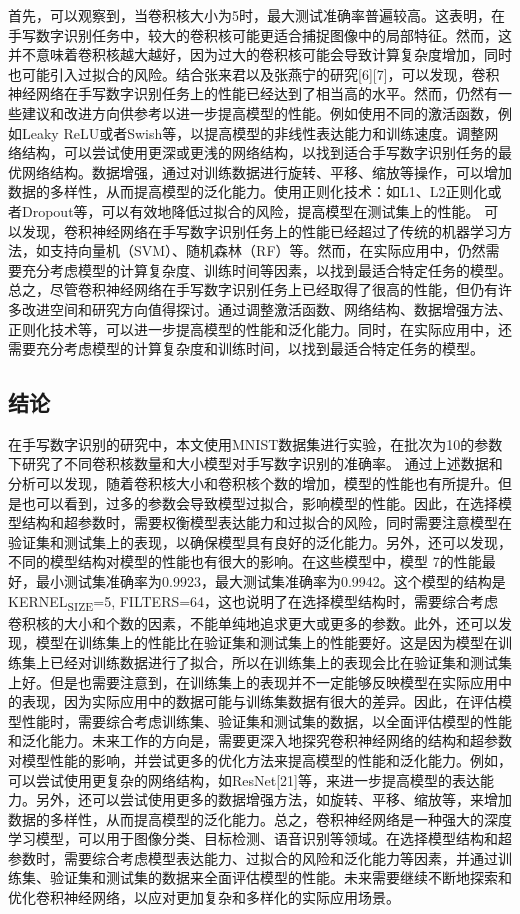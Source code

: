 \documentclass[11pt]{article}
\begin{document}
首先，可以观察到，当卷积核大小为5时，最大测试准确率普遍较高。这表明，在手写数字识别任务中，较大的卷积核可能更适合捕捉图像中的局部特征。然而，这并不意味着卷积核越大越好，因为过大的卷积核可能会导致计算复杂度增加，同时也可能引入过拟合的风险。结合张来君以及张燕宁的研究[6][7]，可以发现，卷积神经网络在手写数字识别任务上的性能已经达到了相当高的水平。然而，仍然有一些建议和改进方向供参考以进一步提高模型的性能。例如使用不同的激活函数，例如Leaky ReLU或者Swish等，以提高模型的非线性表达能力和训练速度。调整网络结构，可以尝试使用更深或更浅的网络结构，以找到适合手写数字识别任务的最优网络结构。数据增强，通过对训练数据进行旋转、平移、缩放等操作，可以增加数据的多样性，从而提高模型的泛化能力。使用正则化技术：如L1、L2正则化或者Dropout等，可以有效地降低过拟合的风险，提高模型在测试集上的性能。
可以发现，卷积神经网络在手写数字识别任务上的性能已经超过了传统的机器学习方法，如支持向量机（SVM）、随机森林（RF）等。然而，在实际应用中，仍然需要充分考虑模型的计算复杂度、训练时间等因素，以找到最适合特定任务的模型。总之，尽管卷积神经网络在手写数字识别任务上已经取得了很高的性能，但仍有许多改进空间和研究方向值得探讨。通过调整激活函数、网络结构、数据增强方法、正则化技术等，可以进一步提高模型的性能和泛化能力。同时，在实际应用中，还需要充分考虑模型的计算复杂度和训练时间，以找到最适合特定任务的模型。
\subsection{结论}
\label{sec:orga2cbf3a}
在手写数字识别的研究中，本文使用MNIST数据集进行实验，在批次为10的参数下研究了不同卷积核数量和大小模型对手写数字识别的准确率。
通过上述数据和分析可以发现，随着卷积核大小和卷积核个数的增加，模型的性能也有所提升。但是也可以看到，过多的参数会导致模型过拟合，影响模型的性能。因此，在选择模型结构和超参数时，需要权衡模型表达能力和过拟合的风险，同时需要注意模型在验证集和测试集上的表现，以确保模型具有良好的泛化能力。另外，还可以发现，不同的模型结构对模型的性能也有很大的影响。在这些模型中，模型 7的性能最好，最小测试集准确率为0.9923，最大测试集准确率为0.9942。这个模型的结构是KERNEL\textsubscript{SIZE}=5, FILTERS=64，这也说明了在选择模型结构时，需要综合考虑卷积核的大小和个数的因素，不能单纯地追求更大或更多的参数。此外，还可以发现，模型在训练集上的性能比在验证集和测试集上的性能要好。这是因为模型在训练集上已经对训练数据进行了拟合，所以在训练集上的表现会比在验证集和测试集上好。但是也需要注意到，在训练集上的表现并不一定能够反映模型在实际应用中的表现，因为实际应用中的数据可能与训练集数据有很大的差异。因此，在评估模型性能时，需要综合考虑训练集、验证集和测试集的数据，以全面评估模型的性能和泛化能力。未来工作的方向是，需要更深入地探究卷积神经网络的结构和超参数对模型性能的影响，并尝试更多的优化方法来提高模型的性能和泛化能力。例如，可以尝试使用更复杂的网络结构，如ResNet[21]等，来进一步提高模型的表达能力。另外，还可以尝试使用更多的数据增强方法，如旋转、平移、缩放等，来增加数据的多样性，从而提高模型的泛化能力。总之，卷积神经网络是一种强大的深度学习模型，可以用于图像分类、目标检测、语音识别等领域。在选择模型结构和超参数时，需要综合考虑模型表达能力、过拟合的风险和泛化能力等因素，并通过训练集、验证集和测试集的数据来全面评估模型的性能。未来需要继续不断地探索和优化卷积神经网络，以应对更加复杂和多样化的实际应用场景。
\end{document}
